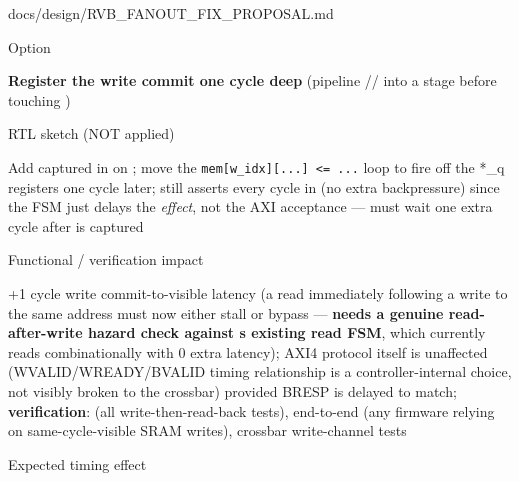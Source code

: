\begin{relocated}{docs/design/RVB_FANOUT_FIX_PROPOSAL.md}
\begin{rowtable}



\begin{rowcell}{Option}

\textbf{Register the write commit one cycle deep} (pipeline
// into a  stage
before touching )

\end{rowcell}

\begin{rowcell}{RTL sketch (NOT applied)}

Add  captured in
 on ; move the
\texttt{mem[w\_\allowbreak{}idx][.\allowbreak{}.\allowbreak{}.\allowbreak{}]\ <=\allowbreak{}\ .\allowbreak{}.\allowbreak{}.\allowbreak{}}
loop to fire off the *\_q registers one cycle later; 
still asserts every cycle in  (no extra backpressure) since
the FSM just delays the \emph{effect}, not the AXI acceptance ---
 must wait one extra cycle after  is
captured

\end{rowcell}

\begin{rowcell}{Functional / verification impact}

+1 cycle write commit-to-visible latency (a read immediately following a
write to the same address must now either stall or bypass ---
\textbf{needs a genuine read-after-write hazard check against
\textquotesingle s existing read FSM}, which
currently reads  combinationally with 0 extra latency);
AXI4 protocol itself is unaffected
(WVALID/\allowbreak{}WREADY/\allowbreak{}BVALID timing relationship is a
controller-internal choice, not visibly broken to the crossbar) provided
BRESP is delayed to match; \textbf{verification}:
 (all write-then-read-back
tests),  end-to-end (any firmware relying on
same-cycle-visible SRAM writes), crossbar write-channel tests

\end{rowcell}

\begin{rowcell}{Expected timing effect}


\end{rowcell}
\end{rowtable}
\end{relocated}
